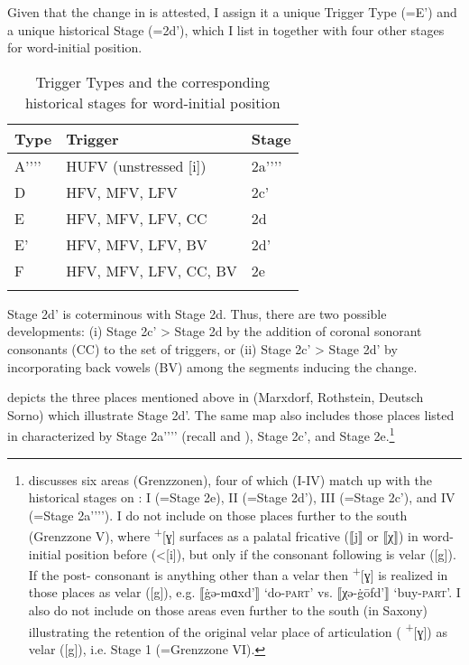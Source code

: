 Given that the change in  is attested, I assign it a unique Trigger Type (=E') and a unique historical Stage (=2d'), which I list in  together with four other stages for word-initial position.

\begin{table}
\caption{Trigger Types and the corresponding historical stages for word-initial position\label{tab:14:3}}
\begin{tabular}{lll}
\lsptoprule
Type & Trigger & Stage\\\midrule
A'{}'{}'{}' & HUFV (unstressed [i]) & 2a'{}'{}'{}'\\
D & HFV, MFV, LFV & 2c'\\
E & HFV, MFV, LFV, CC & 2d\\
E' & HFV, MFV, LFV, BV & 2d'\\
F & HFV, MFV, LFV, CC, BV & 2e\\
\lspbottomrule
\end{tabular}
\end{table}

Stage 2d{}' is coterminous with Stage 2d. Thus, there are two possible developments: (i) Stage 2c' > Stage 2d by the addition of coronal sonorant consonants (CC) to the set of triggers, or (ii) Stage 2c' > Stage 2d' by incorporating back vowels (BV) among the segments inducing the change.

 depicts the three places mentioned above in  (Marxdorf, Rothstein, Deutsch Sorno) which illustrate Stage 2d'. The same map also includes those places listed in \citet{Kieser1963} characterized by Stage 2a'{}'{}'{}' (recall  and ), Stage 2c', and Stage 2e.\footnote{{\citet{Kieser1963} discusses six areas (Grenzzonen), four of which (I-IV) match up with the historical stages on : I (=Stage 2e), II (=Stage 2d'), III (=Stage 2c'), and IV (=Stage 2a'{}'{}'{}'). I do not include on  those places further to the south (Grenzzone V), where } \textrm{\textsuperscript{+}}\textrm{[ɣ] surfaces as a palatal fricative (⟦j⟧ or ⟦χ⟧) in word-initial position before  (<[i]), but only if the consonant following  is velar ([g]). If the post- consonant is anything other than a velar then } \textrm{\textsuperscript{+}}\textrm{[ɣ] is realized in those places as velar ([g]), e.g. ⟦\.{g}ə-mɑxd’⟧ ‘do-}\textrm{\textsc{part}}\textrm{’ vs. ⟦χə-\.{g}ōfd’⟧ ‘buy-}\textrm{\textsc{part}}\textrm{’. I also do not include on  those areas even further to the south (in Saxony) illustrating the retention of the original velar place of articulation (} \textrm{\textsuperscript{+}}\textrm{[ɣ]) as velar ([g]), i.e. Stage 1 (=Grenzzone VI).}}

